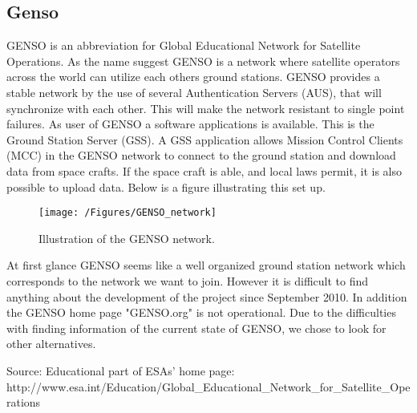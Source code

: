 \subsection{Genso}
GENSO is an abbreviation for Global Educational Network for Satellite Operations. As the name suggest GENSO is a network where satellite operators across the world can utilize each others ground stations. GENSO provides a stable network by the use of several Authentication Servers (AUS), that will synchronize with each other. This will make the network resistant to single point failures. As user of GENSO a software applications is available. This is the Ground Station Server (GSS). A GSS application allows Mission Control Clients (MCC) in the GENSO network to connect to the ground station and download data from space crafts. If the space craft is able, and local laws permit, it is also possible to upload data. Below is a figure illustrating this set up.   

\begin{figure}
\begin{center}
\texttt{[image: /Figures/GENSO\_network]}
\end{center}
\caption{Illustration of the GENSO network.}
\label{GENSO_network}
\end{figure}

At first glance GENSO seems like a well organized ground station network which corresponds to the network we want to join. However it is difficult to find anything about the development of the project since September 2010. In addition the GENSO home page "GENSO.org" is not operational. Due to the difficulties with finding information of the current state of GENSO, we chose to look for other alternatives. 

Source: Educational part of ESAs' home page: http://www.esa.int/Education/Global_Educational_Network_for_Satellite_Operations 
    